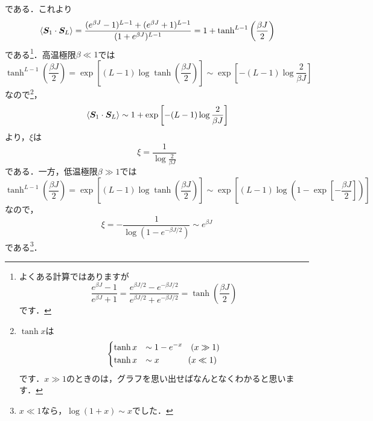 \documentclass[a4paper,pdflatex,ja=standard]{bxjsarticle}
\begin{document}
\begin{enumerate}
  である．これより
  \begin{equation}
    \ev*{\bm{S}_{1}\cdot\bm{S}_{L}}
    =
    \frac{
    (e^{\beta J}-1)^{L-1}
    +
    (e^{\beta J}+1)^{L-1}}{(1+e^{\beta J})^{L-1}}
    =
    1
    +
    \tanh^{L-1}\left( \frac{\beta J}{2} \right)
  \end{equation}
  である\footnote{よくある計算ではありますが
  \begin{equation}
    \frac{e^{\beta J}-1}{e^{\beta J}+1}
    =
    \frac{e^{\beta J/2}-e^{-\beta J/2}}{e^{\beta J/2}+e^{-\beta J/2}}
    =
    \tanh\left( \frac{\beta J}{2} \right)
  \end{equation}
  です．}．高温極限$\beta\ll 1$では
  \begin{equation}
    \tanh^{L-1}\left( \frac{\beta J}{2} \right)
    =
    \exp\left[ (L-1)\log\tanh\left( \frac{\beta J}{2} \right)  \right]
    \sim
    \exp\left[ -(L-1)\log\frac{2}{\beta J} \right]
  \end{equation}
  なので\footnote{$\tanh x$は
  \begin{equation}
    \begin{dcases}
      \tanh x
      &\sim
      1-e^{-x}
      \ \ \ 
      (x\gg 1)
      \\
      \tanh x
      &\sim
      x
      \hspace{1.2cm}
      (x\ll 1)
    \end{dcases}
  \end{equation}
  です．$x\gg 1$のときのは，グラフを思い出せばなんとなくわかると思います．}，
  \begin{equation}
    \ev*{\bm{S}_{1}\cdot\bm{S}_{L}}
    \sim
    1
    +    
    \exp\left[ -(L-1)\log\frac{2}{\beta J} \right]
  \end{equation}
  より，$\xi$は
  \begin{equation}
    \xi
    =
    \frac{1}{\log\frac{2}{\beta J}}
  \end{equation}
  である．一方，低温極限$\beta\gg 1$では
  \begin{equation}
    \tanh^{L-1}\left( \frac{\beta J}{2} \right)
    =
    \exp\left[ (L-1)\log\tanh\left( \frac{\beta J}{2} \right)  \right]
    \sim
    \exp\left[ (L-1)\log\left( 1-\exp\left[ -\frac{\beta J}{2} \right] \right)  \right]
  \end{equation}
  なので，
  \begin{equation}
    \xi
    =
    -
    \frac{1}{\log\left( 1-e^{-\beta J/2} \right)}
    \sim
    e^{\beta J}
  \end{equation}
  である\footnote{$x\ll1$なら，$\log(1+x)\sim x$でした．}．
\end{enumerate}
\end{document}

